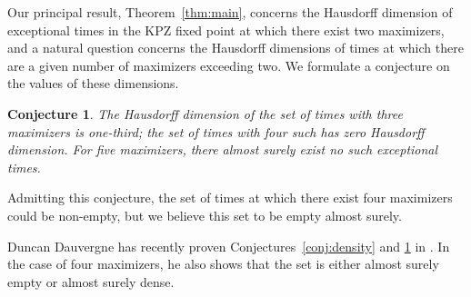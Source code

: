 \documentclass[oneside,final,11pt]{amsart}
\newtheorem{conjec}[thm]{Conjecture}
\theoremstyle{definition}
\newcommand{\fh}{\mathfrak{h}}
\newcommand{\CT}{\mathcal{T}}
\newcommand{\1}[1]{\mathbf{1}_{#1}}
\let\emptyset\varnothing
\numberwithin{equation}{section}
\begin{document}

\medskip
Our principal result, Theorem~\ref{thm:main},  concerns the Hausdorff dimension of exceptional times in the KPZ fixed point at which there exist  two maximizers, and a natural question concerns the Hausdorff dimensions of times at which there are a given number of  maximizers exceeding two. We formulate a conjecture on the values of these dimensions.
\begin{conjec}\label{conj:multiple maximizers}
The Hausdorff dimension of the set of times with three maximizers is one-third; the set of times with four such has zero Hausdorff dimension. For five maximizers, there almost surely exist no such exceptional times.
\end{conjec}

Admitting this conjecture, the set of times at which there exist four maximizers could be non-empty, but we believe this set to be empty almost surely.

Duncan Dauvergne has recently proven Conjectures~\ref{conj:density} and \ref{conj:multiple maximizers} in \cite{dauvergne2022non}. In the case of four maximizers, he also shows that the set is either almost surely empty or almost surely dense.
\end{document}
